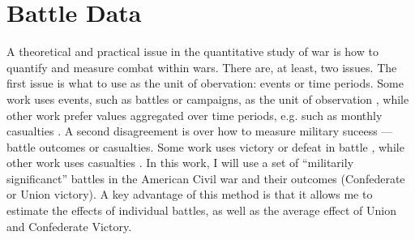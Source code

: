 \section{Battle Data}
\label{bonds_battles:sec:battle-data}

A theoretical and practical issue in the quantitative study of war is how to quantify and measure combat within wars.
There are, at least, two issues. 
The first issue is what to use as the unit of obervation: events or time periods.
Some work uses events, such as battles or campaigns, as the unit of observation \parencites{ReiterStam1998}{ReiterStam2002}{Ramsay2008}{PilsterBoehmelt2011a}{GrauerHorowitz2012}, while other work prefer values aggregated over time periods, e.g. such as monthly casualties \textcite{Weisiger2015}.
A second disagreement is over how to measure military suceess --- battle outcomes or casualties.
Some work uses victory or defeat in battle \parencites{ReiterStam1998}{ReiterStam2002}{GrauerHorowitz2012}, while other work uses casualties \parencites{Biddle2004}{BiddleLong2004}{PilsterBoehmelt2011a}.
In this work, I will use a set of ``militarily significanct'' battles in the American Civil war and their outcomes (Confederate or Union victory).
A key advantage of this method is that it allows me to estimate the effects of individual battles, as well as the average effect of Union and Confederate Victory.


